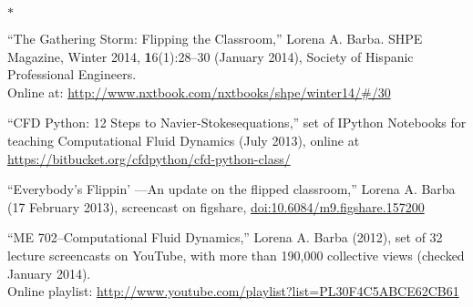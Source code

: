 \documentclass{proposalnsf}
\newlength{\up}
\newlength{\hup}
\begin{document}
\vspace{\hup}
\begin{list}{$\ast$}{\setlength{\leftmargin}{1em}}

\item ``The Gathering Storm: Flipping the Classroom,'' Lorena A. Barba. SHPE Magazine, Winter 2014, \textbf{1}6(1):28--30 (January 2014), Society of Hispanic Professional Engineers. \\ Online at: \href{http://www.nxtbook.com/nxtbooks/shpe/winter14/#/30}{http://www.nxtbook.com/nxtbooks/shpe/winter14/\#/30}

\item ``CFD Python: 12 Steps to Navier-Stokesequations,'' set of IPython Notebooks for teaching Computational Fluid Dynamics (July 2013), online at \href{https://bitbucket.org/cfdpython/cfd-python-class/}{https://bitbucket.org/cfdpython/cfd-python-class/}

\item ``Everybody's Flippin' ---An update on the flipped classroom,'' Lorena A. Barba (17 February 2013), screencast on figshare, 
\href{http://dx.doi.org/10.6084/m9.figshare.157200}{doi:10.6084/m9.figshare.157200}

\item ``ME 702--Computational Fluid Dynamics,'' Lorena A. Barba (2012), set of 32 lecture screencasts on YouTube, with more than 190,000 collective views (checked January 2014). \\
Online playlist: \href{http://www.youtube.com/playlist?list=PL30F4C5ABCE62CB61}{http://www.youtube.com/playlist?list=PL30F4C5ABCE62CB61}


\end{list}
\end{document}
